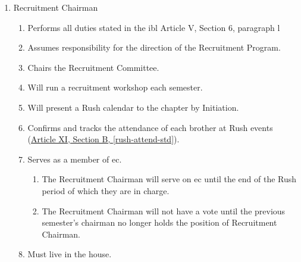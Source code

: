 \begin{enumerate}
        \item Recruitment Chairman
			\begin{enumerate}
				\item Performs all duties stated in the \gls{ibl} Article V, Section 6, paragraph l
				\item Assumes responsibility for the direction of the Recruitment Program.
				\item Chairs the Recruitment Committee.
				\item Will run a recruitment workshop each semester.
				\item Will present a Rush calendar to the chapter by Initiation.
				\item Confirms and tracks the attendance of each brother at Rush events (\hyperref[rush-attend-std]{Article XI, Section B, \autoref*{rush-attend-std}}). 
				\item Serves as a member of \gls{ec}. \label{recruit-chair-term}
					\begin{enumerate}
						\item The Recruitment Chairman will serve on \gls{ec} until the end of the Rush period of which they are in charge.
						\item The Recruitment Chairman will not have a vote until the previous semester's chairman no longer holds the position of Recruitment Chairman.
					\end{enumerate}
                \item Must live in the house.
			\end{enumerate}


\end{enumerate}
